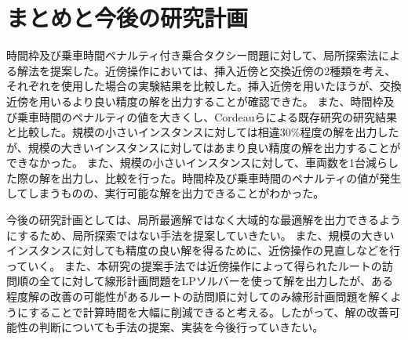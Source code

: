 \chapter{まとめと今後の研究計画}\label{conclution}
時間枠及び乗車時間ペナルティ付き乗合タクシー問題に対して、局所探索法による解法を提案した。近傍操作においては、挿入近傍と交換近傍の2種類を考え、それぞれを使用した場合の実験結果を比較した。挿入近傍を用いたほうが、交換近傍を用いるより良い精度の解を出力することが確認できた。
また、時間枠及び乗車時間のペナルティの値を大きくし、Cordeauらによる既存研究の研究結果と比較した。規模の小さいインスタンスに対しては相違30\%程度の解を出力したが、規模の大きいインスタンスに対してはあまり良い精度の解を出力することができなかった。
また、規模の小さいインスタンスに対して、車両数を1台減らした際の解を出力し、比較を行った。時間枠及び乗車時間のペナルティの値が発生してしまうものの、実行可能な解を出力できることがわかった。

今後の研究計画としては、局所最適解ではなく大域的な最適解を出力できるようにするため、局所探索ではない手法を提案していきたい。
また、規模の大きいインスタンスに対しても精度の良い解を得るために、近傍操作の見直しなどを行っていく。
また、本研究の提案手法では近傍操作によって得られたルートの訪問順の全てに対して線形計画問題をLPソルバーを使って解を出力したが、ある程度解の改善の可能性があるルートの訪問順に対してのみ線形計画問題を解くようにすることで計算時間を大幅に削減できると考える。したがって、解の改善可能性の判断についても手法の提案、実装を今後行っていきたい。
